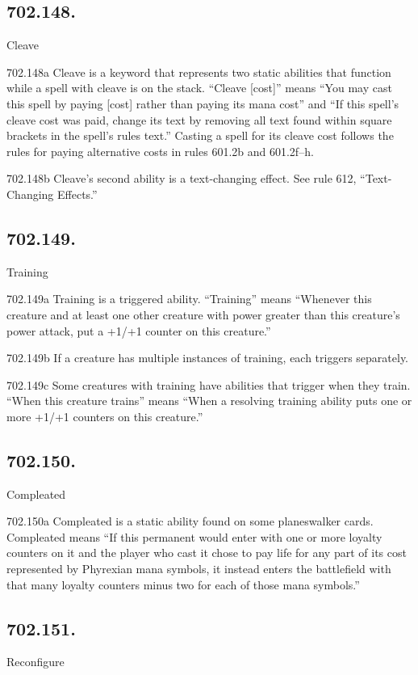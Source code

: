 \subsection*{702.148.}
Cleave

702.148a Cleave is a keyword that represents two static abilities that function while a spell with cleave is on the stack. “Cleave [cost]” means “You may cast this spell by paying [cost] rather than paying its mana cost” and “If this spell’s cleave cost was paid, change its text by removing all text found within square brackets in the spell’s rules text.” Casting a spell for its cleave cost follows the rules for paying alternative costs in rules 601.2b and 601.2f–h.

702.148b Cleave’s second ability is a text-changing effect. See rule 612, “Text-Changing Effects.”

\subsection*{702.149.}
Training

702.149a Training is a triggered ability. “Training” means “Whenever this creature and at least one other creature with power greater than this creature’s power attack, put a +1/+1 counter on this creature.”

702.149b If a creature has multiple instances of training, each triggers separately.

702.149c Some creatures with training have abilities that trigger when they train. “When this creature trains” means “When a resolving training ability puts one or more +1/+1 counters on this creature.”

\subsection*{702.150.}
Compleated

702.150a Compleated is a static ability found on some planeswalker cards. Compleated means “If this permanent would enter with one or more loyalty counters on it and the player who cast it chose to pay life for any part of its cost represented by Phyrexian mana symbols, it instead enters the battlefield with that many loyalty counters minus two for each of those mana symbols.”

\subsection*{702.151.}
Reconfigure

